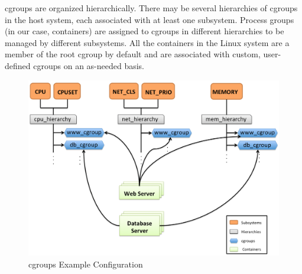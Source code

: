 %
%
%
%
%
%
%
%
%
%
%
%    
%    
%    
%    
%
%
%
%
%
%

cgroups are organized hierarchically. There may be several hierarchies of cgroups in the host system, each associated with at least one subsystem. Process groups (in our case, containers) are assigned to cgroups in different hierarchies to be managed by different subsystems. All the containers in the Linux system are a member of the root cgroup by default and are associated with custom, user-defined cgroups on an as-needed basis.

\begin{figure}[H]
\centering
\includegraphics[width=\textwidth]{cgroup-example.png}
\caption{cgroups Example Configuration}
\label{img_cgroup_example}
\end{figure}

